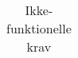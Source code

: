 \begin{table} [htbp]
\begin{tabular}{|p{10cm}|l|l|}
\end{tabular}
\caption{Ikke-funktionelle krav}
\label{tb:ikkefunkkrav} 
\end{table}
